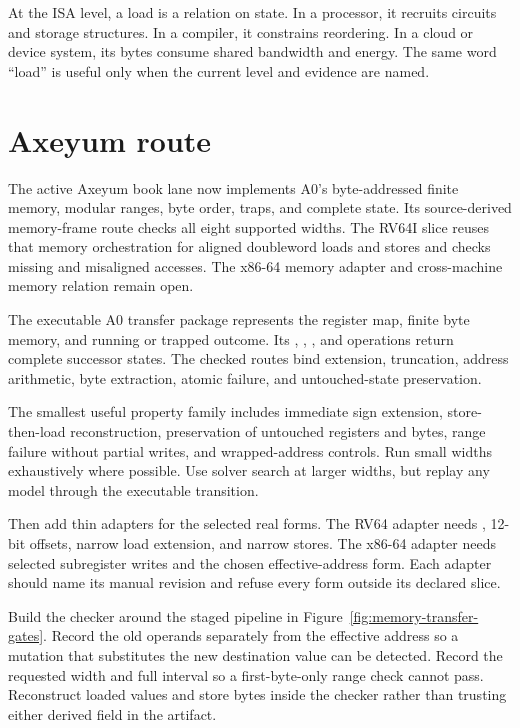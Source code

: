 \begin{archive}[title={Movement is where abstractions meet physics}]
At the ISA level, a load is a relation on state. In a processor, it recruits
circuits and storage structures. In a compiler, it constrains reordering. In a
cloud or device system, its bytes consume shared bandwidth and energy. The
same word ``load'' is useful only when the current level and evidence are named.
\end{archive}

\section{Axeyum route}

The active Axeyum book lane now implements A0's byte-addressed finite memory,
modular ranges, byte order, traps, and complete state. Its source-derived
memory-frame route checks all eight supported widths. The RV64I slice reuses
that memory orchestration for aligned doubleword loads and stores and checks
missing and misaligned accesses. The x86-64 memory adapter and cross-machine
memory relation remain open.

The executable A0 transfer package represents the register map, finite byte
memory, and running or trapped outcome. Its , ,
, and  operations return complete successor states.
The checked routes bind extension, truncation, address arithmetic, byte
extraction, atomic failure, and untouched-state preservation.

The smallest useful property family includes immediate sign extension,
store-then-load reconstruction, preservation of untouched registers and bytes,
range failure without partial writes, and wrapped-address controls. Run small
widths exhaustively where possible. Use solver search at larger widths, but
replay any model through the executable transition.

Then add thin adapters for the selected real forms. The RV64 adapter needs
, 12-bit offsets, narrow load extension, and narrow stores. The
x86-64 adapter needs selected subregister writes and the chosen effective-address
form. Each adapter should name its manual revision and refuse every form outside
its declared slice.

Build the checker around the staged pipeline in
Figure~\ref{fig:memory-transfer-gates}. Record the old operands separately
from the effective address so a mutation that substitutes the new destination
value can be detected. Record the requested width and full interval so a
first-byte-only range check cannot pass. Reconstruct loaded values and store
bytes inside the checker rather than trusting either derived field in the
artifact.


